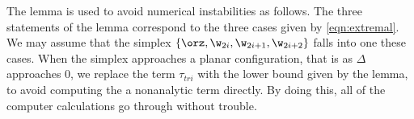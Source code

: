 The lemma is used to avoid numerical instabilities as follows.  The
three statements of the lemma correspond to the three cases given by
\eqref{eqn:extremal}.  We may assume that the simplex
$\{\orz,\w_{2i},\w_{2i+1},\w_{2i+2}\}$ falls into one these cases.
When the simplex approaches a planar configuration, that is as
$\Delta$ approaches $0$, we replace the term $\tau_{tri}$ with the
lower bound given by the lemma, to avoid computing the a nonanalytic
term directly.  By doing this, all of the computer calculations go
through without trouble.
